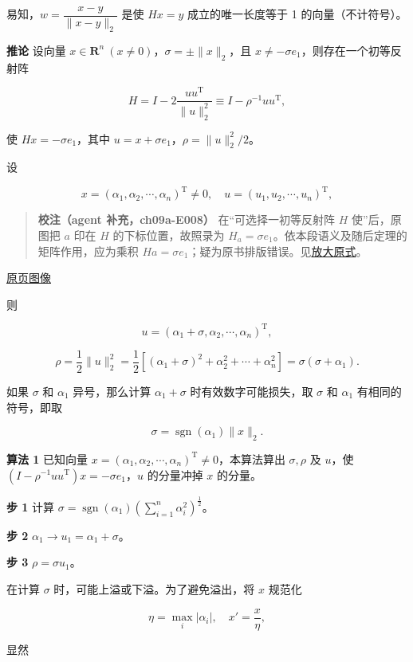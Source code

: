 \documentclass[
  10pt,
  fontset=fandol]{ctexart}
\begin{document}
易知，\(w=\dfrac{x-y}{\|x-y\|_2}\) 是使 \(Hx=y\) 成立的唯一长度等于 1 的向量（不计符号）。

\textbf{推论} 设向量 \(x\in\mathbf R^n\ (x\ne0)\)，\(\sigma=\pm\|x\|_2\)，且 \(x\ne-\sigma e_1\)，则存在一个初等反射阵

\[
H=I-2\frac{uu^{\mathrm T}}{\|u\|_2^2}\equiv I-\rho^{-1}uu^{\mathrm T},
\]

使 \(Hx=-\sigma e_1\)，其中 \(u=x+\sigma e_1\)，\(\rho=\|u\|_2^2/2\)。

设

\[
x=(\alpha_1,\alpha_2,\cdots,\alpha_n)^{\mathrm T}\ne0,\quad u=(u_1,u_2,\cdots,u_n)^{\mathrm T},
\]

\begin{quote}
\textbf{校注（agent 补充，ch09a-E008）} 在``可选择一初等反射阵 \(H\) 使''后，原图把 \(a\) 印在 \(H\) 的下标位置，故照录为 \(H_a=\sigma e_1\)。依本段语义及随后定理的矩阵作用，应为乘积 \(Ha=\sigma e_1\)；疑为原书排版错误。见\href{../assets/ch09a/review-p244-Ha.png}{放大原式}。
\end{quote}

\href{../../source-images/pdf-245.jpeg}{原页图像}

则

\[
u=(\alpha_1+\sigma,\alpha_2,\cdots,\alpha_n)^{\mathrm T},
\]

\[
\rho=\frac12\|u\|_2^2=\frac12\left[(\alpha_1+\sigma)^2+\alpha_2^2+\cdots+\alpha_n^2\right]=\sigma(\sigma+\alpha_1).
\]

如果 \(\sigma\) 和 \(\alpha_1\) 异号，那么计算 \(\alpha_1+\sigma\) 时有效数字可能损失，取 \(\sigma\) 和 \(\alpha_1\) 有相同的符号，即取

\[
\sigma=\operatorname{sgn}(\alpha_1)\|x\|_2.
\]

\textbf{算法 1} 已知向量 \(x=(\alpha_1,\alpha_2,\cdots,\alpha_n)^{\mathrm T}\ne0\)，本算法算出 \(\sigma,\rho\) 及 \(u\)，使 \((I-\rho^{-1}uu^{\mathrm T})x=-\sigma e_1\)，\(u\) 的分量冲掉 \(x\) 的分量。

\textbf{步 1} 计算 \(\sigma=\operatorname{sgn}(\alpha_1)\left(\displaystyle\sum_{i=1}^n\alpha_i^2\right)^{\frac12}\)。

\textbf{步 2} \(\alpha_1\to u_1=\alpha_1+\sigma\)。

\textbf{步 3} \(\rho=\sigma u_1\)。

在计算 \(\sigma\) 时，可能上溢或下溢。为了避免溢出，将 \(x\) 规范化

\[
\eta=\max_i|\alpha_i|,\quad x'=\frac{x}{\eta},
\]

显然
\end{document}
